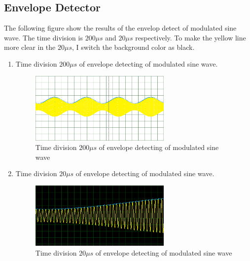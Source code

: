 \documentclass [utf8] {article}
\begin{document}
{	\subsection{Envelope Detector}
	{
		The following figure show the results of the envelop detect of modulated sine wave. The time division is $200\mu s$ and $20\mu s$ respectively. To make the yellow line more clear in the $20\mu s$, I switch the background color as black.
		\begin{enumerate}
			\item Time division $200\mu s$ of envelope detecting of modulated sine wave.
			\begin{figure}[H]
				\begin{small}
					\begin{center}
						\includegraphics[width=0.65\textwidth]{figures/Figure19.png}
					\end{center}
					\caption{Time division $200\mu s$ of envelope detecting of modulated sine wave}
					\label{fig:fig-3-1}
				\end{small}
			\end{figure}
			\item Time division $20\mu s$ of envelope detecting of modulated sine wave.
			\begin{figure}
				\begin{small}
					\begin{center}
						\includegraphics[width=0.65\textwidth]{figures/Figure20.png}
					\end{center}
					\caption{Time division $20\mu s$ of envelope detecting of modulated sine wave}
					\label{fig:fig-3-2}
				\end{small}
			\end{figure}
		\end{enumerate}
		
}}
\end{document}
